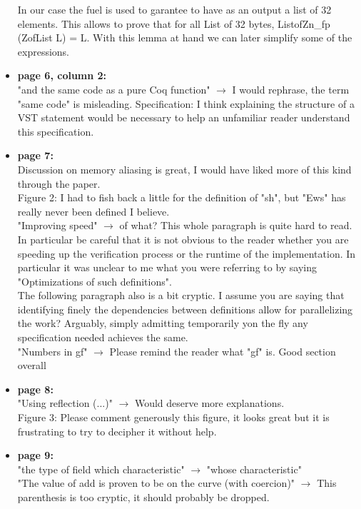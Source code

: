 \begin{itemize}
          \begin{answer}
              In our case the fuel is used to garantee to have as an output a list of 32 elements. This allows to prove that for all List of 32 bytes, ListofZn\_fp (ZofList L) = L. With this lemma at hand we can later simplify some of the expressions.
          \end{answer}

    \item \textbf{page 6, column 2:}\\
          "and the same code as a pure Coq function" $\rightarrow$ I would rephrase, the term "same code" is misleading.
          Specification: I think explaining the structure of a VST statement would be necessary to help an unfamiliar reader understand this specification.

    \item \textbf{page 7:}\\
          Discussion on memory aliasing is great, I would have liked more of this kind through the paper.\\
          Figure 2: I had to fish back a little for the definition of "sh", but "Ews" has really never been defined I believe.\\
          "Improving speed" $\rightarrow$ of what? This whole paragraph is quite hard to read. In particular be careful that it is not obvious to the reader whether you are speeding up the verification process or the runtime of the implementation. In particular it was unclear to me what you were referring to by saying "Optimizations of such definitions".\\
          The following paragraph also is a bit cryptic. I assume you are saying that identifying finely the dependencies between definitions allow for parallelizing the work? Arguably, simply admitting temporarily yon the fly any specification needed  achieves the same.\\
          "Numbers in gf" $\rightarrow$ Please remind the reader what "gf" is. Good section overall

    \item \textbf{page 8:}\\
          "Using reflection (...)" $\rightarrow$ Would deserve more explanations.\\
          Figure 3: Please comment generously this figure, it looks great but it is frustrating to try to decipher it without help.

    \item \textbf{page 9:}\\
          {\color{gray}"the type of field which characteristic" $\rightarrow$ "whose characteristic"\\
          "The value of add is proven to be on the curve (with coercion)" $\rightarrow$ This parenthesis is too cryptic, it should probably be dropped.}


\end{itemize}
